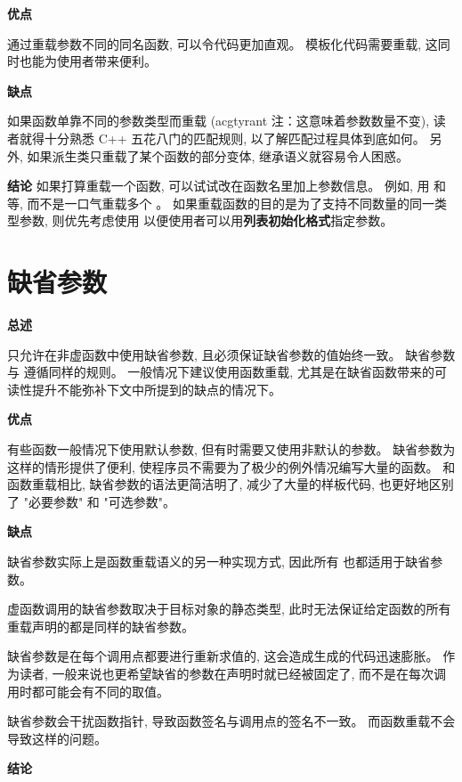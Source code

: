 \textbf{优点}

通过重载参数不同的同名函数, 可以令代码更加直观。 模板化代码需要重载, 这同时也能为使用者带来便利。

\textbf{缺点}

如果函数单靠不同的参数类型而重载 (acgtyrant 注：这意味着参数数量不变), 读者就得十分熟悉 C++ 五花八门的匹配规则, 以了解匹配过程具体到底如何。 另外, 如果派生类只重载了某个函数的部分变体, 继承语义就容易令人困惑。

\textbf{结论}
如果打算重载一个函数, 可以试试改在函数名里加上参数信息。 例如, 用  和  等, 而不是一口气重载多个 。 如果重载函数的目的是为了支持不同数量的同一类型参数, 则优先考虑使用  以便使用者可以用\textbf{列表初始化格式}指定参数。

\section{缺省参数}

\textbf{总述}

只允许在非虚函数中使用缺省参数, 且必须保证缺省参数的值始终一致。 缺省参数与  遵循同样的规则。 一般情况下建议使用函数重载, 尤其是在缺省函数带来的可读性提升不能弥补下文中所提到的缺点的情况下。

\textbf{优点}

有些函数一般情况下使用默认参数, 但有时需要又使用非默认的参数。 缺省参数为这样的情形提供了便利, 使程序员不需要为了极少的例外情况编写大量的函数。 和函数重载相比, 缺省参数的语法更简洁明了, 减少了大量的样板代码, 也更好地区别了 "必要参数" 和 "可选参数"。

\textbf{缺点}

缺省参数实际上是函数重载语义的另一种实现方式, 因此所有  也都适用于缺省参数。

虚函数调用的缺省参数取决于目标对象的静态类型, 此时无法保证给定函数的所有重载声明的都是同样的缺省参数。

缺省参数是在每个调用点都要进行重新求值的, 这会造成生成的代码迅速膨胀。 作为读者, 一般来说也更希望缺省的参数在声明时就已经被固定了, 而不是在每次调用时都可能会有不同的取值。

缺省参数会干扰函数指针, 导致函数签名与调用点的签名不一致。 而函数重载不会导致这样的问题。

\textbf{结论}

